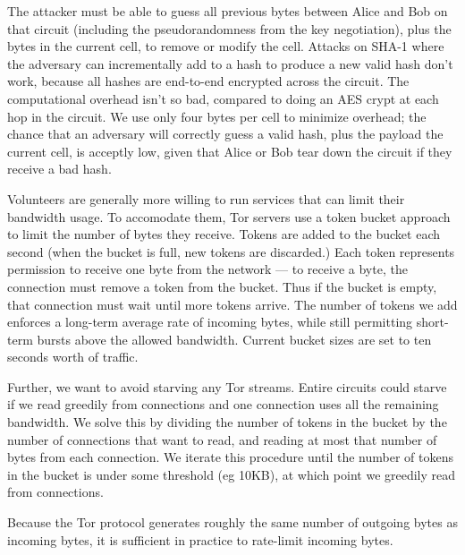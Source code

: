 \documentclass[times,10pt,twocolumn]{article}
\begin{document}
The attacker must be able to guess all previous bytes between Alice
and Bob on that circuit (including the pseudorandomness from the key
negotiation), plus the bytes in the current cell, to remove or modify the
cell. Attacks on SHA-1 where the adversary can incrementally add to a
hash to produce a new valid hash \cite{practical-crypto} don't work,
because all hashes are end-to-end encrypted across the circuit.
The computational overhead isn't so bad, compared to doing an AES
crypt at each hop in the circuit. We use only four bytes per cell to
minimize overhead; the chance that an adversary will correctly guess a
valid hash, plus the payload the current cell, is acceptly low, given
that Alice or Bob tear down the circuit if they receive a bad hash.


Volunteers are generally more willing to run services that can limit
their bandwidth usage.  To accomodate them, Tor servers use a token
bucket approach \cite{foo} to limit the number of bytes they
receive. Tokens are added to the bucket each second (when the bucket is
full, new tokens are discarded.) Each token represents permission to
receive one byte from the network --- to receive a byte, the connection
must remove a token from the bucket. Thus if the bucket is empty, that
connection must wait until more tokens arrive. The number of tokens we
add enforces a long-term average rate of incoming bytes, while still
permitting short-term bursts above the allowed bandwidth. Current bucket
sizes are set to ten seconds worth of traffic.

Further, we want to avoid starving any Tor streams. Entire circuits
could starve if we read greedily from connections and one connection
uses all the remaining bandwidth. We solve this by dividing the number
of tokens in the bucket by the number of connections that want to read,
and reading at most that number of bytes from each connection. We iterate
this procedure until the number of tokens in the bucket is under some
threshold (eg 10KB), at which point we greedily read from connections.

Because the Tor protocol generates roughly the same number of outgoing
bytes as incoming bytes, it is sufficient in practice to rate-limit
incoming bytes.
\end{document}
